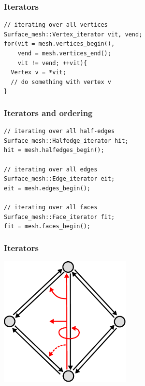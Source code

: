 
\begin{frame}
\end{frame}


\begin{frame}[fragile]
\frametitle{Iterators}
\begin{lstlisting}
// iterating over all vertices
Surface_mesh::Vertex_iterator vit, vend;
for(vit = mesh.vertices_begin(),
    vend = mesh.vertices_end();
    vit != vend; ++vit){
  Vertex v = *vit;
  // do something with vertex v
}
\end{lstlisting}
\end{frame}

\begin{frame}[fragile]
\frametitle{Iterators and ordering}
\begin{lstlisting}
// iterating over all half-edges
Surface_mesh::Halfedge_iterator hit;
hit = mesh.halfedges_begin();

// iterating over all edges
Surface_mesh::Edge_iterator eit;
eit = mesh.edges_begin();

// iterating over all faces
Surface_mesh::Face_iterator fit;
fit = mesh.faces_begin();
\end{lstlisting}
\end{frame}

\begin{frame}
\frametitle{Iterators}
\begin{center}
	\includegraphics[width=0.5\textwidth]{figures/halfedge-connectivity}
\end{center}
\end{frame}

